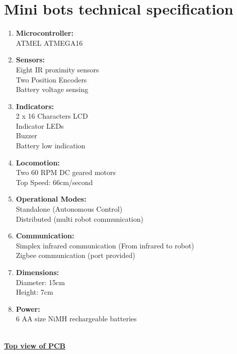 \documentclass[a4paper,12pt,oneside]{book}
\begin{document}
	\chapter{Mini bots technical specification}
	\begin{enumerate}
		\item{\textbf{\large{Microcontroller:}}\\ATMEL ATMEGA16}\
		\item{\textbf{\large{Sensors:}}\\Eight IR proximity sensors\\Two Position Encoders\\Battery voltage sensing}
		\item{\textbf{\large{Indicators:}}\\2 x 16 Characters LCD\\
			Indicator LEDs\\
			Buzzer\\
			Battery low indication}\\
		\item{\textbf{\large{Locomotion:}}\\Two 60 RPM DC geared motors\\Top Speed: 66cm/second\\}
		\item{\textbf{\large{Operational Modes:}}\\Standalone (Autonomous Control)\\
			Distributed (multi robot communication)\\} 
		\item{\textbf{\large{Communication:}}\\Simplex infrared communication (From infrared to robot)\\
		Zigbee communication (port provided)\\} 
		\item{\textbf{\large{Dimensions:}}\\Diameter: 15cm\\
			Height: 7cm\\} 
		\item{\textbf{\large{Power:}}\\6 AA size NiMH rechargeable batteries} 
	\end{enumerate}
	\hfill\\	
	\underline{\textbf{\Large{Top view of PCB}}}
\end{document}
